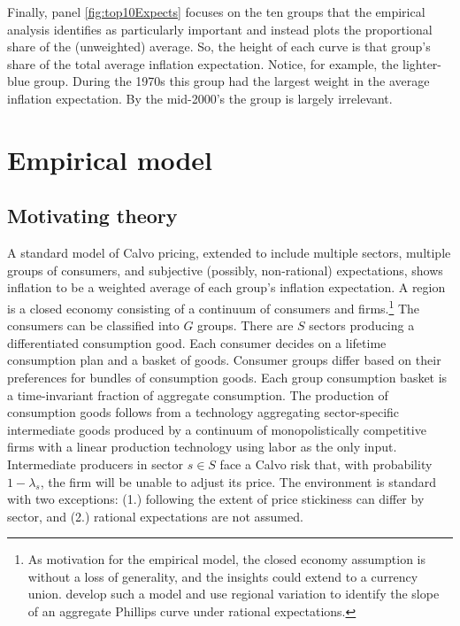 \documentclass[12pt]{article}
\begin{document}
Finally, panel \ref{fig:top10Expects} focuses on the ten groups that the empirical analysis identifies as particularly important and instead plots the proportional share of the (unweighted) average.  So, the height of each curve is that group's share of the total average inflation expectation.  Notice, for example, the lighter-blue group.  During the 1970s this group had the largest weight in the average inflation expectation.  By the mid-2000's the group is largely irrelevant.

\section{Empirical model}

\subsection{Motivating theory}

A standard model of Calvo pricing, extended to include multiple sectors, multiple groups of consumers, and subjective (possibly, non-rational) expectations, shows inflation to be a weighted average of each group's inflation expectation. A region is a closed economy consisting of a continuum of consumers and firms.\footnote{As motivation for the empirical model, the closed economy assumption is without a loss of generality, and the insights could extend to a currency union. \cite{NakamuraSteinsson:QJE2022} develop such a model and use regional variation to identify the slope of an aggregate Phillips curve under rational expectations.} The consumers can be classified into $G$ groups. There are $S$ sectors producing a differentiated consumption good. Each consumer decides on a lifetime consumption plan and a basket of goods. Consumer groups differ based on their preferences for bundles of consumption goods. Each group consumption basket is a time-invariant fraction of aggregate consumption. The production of consumption goods follows from a technology aggregating sector-specific intermediate goods produced by a continuum of monopolistically competitive firms with a linear production technology using labor as the only input. Intermediate producers in sector $s\in S$ face a Calvo risk that, with probability $1-\lambda_s$, the firm will be unable to adjust its price. The environment is standard with two exceptions: (1.) following \cite{Cravinoetal:JME2020} the extent of price stickiness can differ by sector, and (2.) rational expectations are not assumed.
\end{document}
